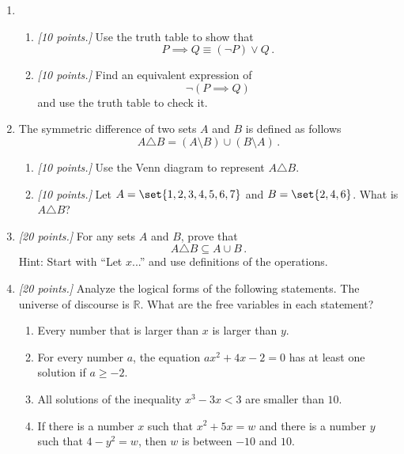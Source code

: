 \documentclass[12pt]{amsart}
\begin{document}
\begin{enumerate}[label=\arabic*.,itemsep=10pt, leftmargin=*]
    \item
        \begin{enumerate}
            \item \textit{[10 points.]} Use the truth table to show that
        \begin{equation*}
            P\implies Q \equiv (\neg P) \vee  Q \,.
        \end{equation*}
    \item \textit{[10 points.]} Find an equivalent expression of 
        \begin{equation*}
            \neg( P \implies Q) 
        \end{equation*}
        and use the truth table to check it.
        \end{enumerate}
\newpage
    \item 
        The symmetric difference of two sets $A$ and $B$ is defined as follows
        \begin{equation*}
            A \triangle B = (A\setminus B) \cup (B\setminus A) \,.
        \end{equation*}
        \begin{enumerate}
            \item \textit{[10 points.]}
                Use the Venn diagram to represent $A \triangle B$.
            \item \textit{[10 points.]}
                Let $A = \set{1,2,3,4,5,6,7}$ and $B = \set{2,4,6}$. What is $A\triangle B$?
        \end{enumerate}
        \newpage
        \item \textit{[20 points.]} For any sets $A$ and $B$, prove that
                \begin{equation*}
                    A \triangle B \subseteq A \cup B \,.
                \end{equation*}
                Hint: Start with ``Let $x$...'' and use definitions of the operations.

                \newpage
                \item\textit{[20 points.]}
                Analyze the logical forms of the following statements. The universe of discourse is $\mathbb{R}.$ What are the free variables in each statement?
\begin{enumerate}
    \item Every number that is larger than $x$ is larger than $y$. \\
    \item For every number $a$, the equation $ax^2+4x-2=0$ has at least one solution if $a\ge -2.$\\
    \item All solutions of the inequality $x^3-3x<3$ are smaller than $10.$\\
    \item If there is a number $x$ such that $x^2+5x=w$ and there is a number $y$ such that $4-y^2=w$, then $w$ is between $-10$ and $10.$\\
\end{enumerate}


\end{enumerate}
\end{document}
